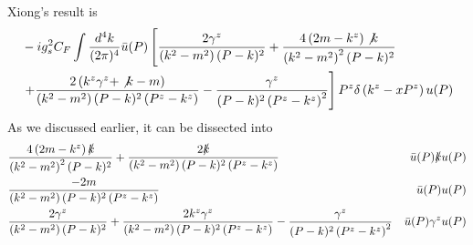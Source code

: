 \documentclass{article}
\begin{document}
Xiong's result is
\begin{align}
	  & -i g_{s}^{2} C_{F} \int \frac{d^{4} k}{(2 \pi)^{4}} \bar{u}(P)\left[
		\frac{2 \gamma^{z}}{\left(k^{2}-m^{2}\right)(P-k)^{2}}
		+\frac{4\left(2 m-k^{z}\right) \not k}{\left(k^{2}-m^{2}\right)^{2}(P-k)^{2}}\right.\notag\\
	  & \left.+\frac{2\left(k^{z} \gamma^{z}+\not k-m\right)}{\left(k^{2}-m^{2}\right)(P-k)^{2}\left(P^{z}-k^{z}\right)}
		-\frac{\gamma^{z}}{(P-k)^{2}\left(P^{z}-k^{z}\right)^{2}}
		\right] P^{z} \delta\left(k^{z}-x P^{z}\right) u(P)
\end{align}
As we discussed earlier, it can be dissected into
\begin{align}
	  & \frac{4\left(2 m-k^{z}\right) \slashed k}{\left(k^{2}-m^{2}\right)^{2}(P-k)^{2}}+\frac{2\slashed k}{\left(k^{2}-m^{2}\right)(P-k)^{2}\left(P^{z}-k^{z}\right)}                                    & \bar u(P)\slashed{k}u(P) \\
	  & \frac{-2m}{\left(k^{2}-m^{2}\right)(P-k)^{2}\left(P^{z}-k^{z}\right)}                                                                                                                             & \bar u(P)u(P)            \\
	  & \frac{2 \gamma^z}{\left(k^{2}-m^{2}\right)(P-k)^{2}}+\frac{2k^{z} \gamma^{z}}{\left(k^{2}-m^{2}\right)(P-k)^{2}\left(P^{z}-k^{z}\right)}-\frac{\gamma^{z}}{(P-k)^{2}\left(P^{z}-k^{z}\right)^{2}} & \bar u(P)\gamma^zu(P)
\end{align}

\printendnotes



\end{document}
